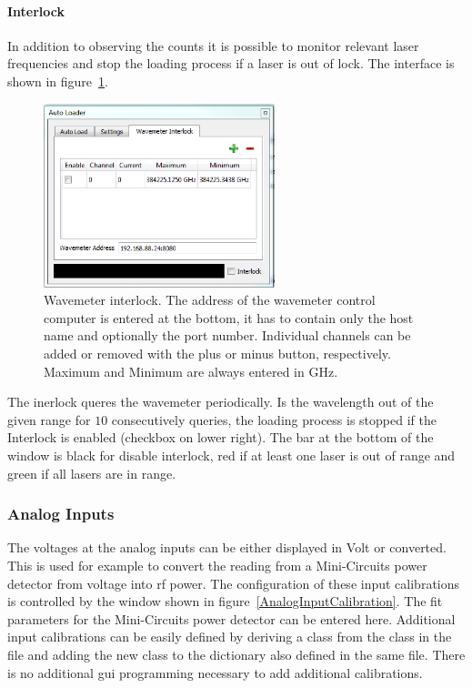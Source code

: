 \documentclass[11pt]{scrartcl}
\begin{document}
\paragraph{Interlock}
In addition to observing the counts it is possible to monitor relevant laser frequencies and stop the loading process if a laser is out of lock. The interface is shown in figure~\ref{WavemeterInterlock}.
\begin{figure}
\centering
\includegraphics[width=0.6\textwidth]{WavemeterInterlock}
\caption{\label{WavemeterInterlock} Wavemeter interlock. The address of the wavemeter control computer is entered at the bottom, it has to contain only the host name and optionally the port number. Individual channels can be added or removed with the plus or minus button, respectively. Maximum and Minimum are always entered in GHz.}
\end{figure}

The inerlock queres the wavemeter periodically. Is the wavelength out of the given range for $10$ consecutively queries, the loading process is stopped if the Interlock is enabled (checkbox on lower right). The bar at the bottom of the window is black for disable interlock, red if at least one laser is out of range and green if all lasers are in range.

\subsubsection{Analog Inputs}
The voltages at the analog inputs can be either displayed in Volt or converted. This is used for example to convert the reading from a Mini-Circuits power detector from voltage into rf power. The configuration of these input calibrations is controlled by the window shown in figure~\ref{AnalogInputCalibration}. The fit parameters for the Mini-Circuits power detector can be entered here. Additional input calibrations can be easily defined by deriving a class from the class  in the file  and adding the new class to the dictionary  also defined in the same file. There is no additional gui programming necessary to add additional calibrations.
\end{document}
